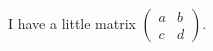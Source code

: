\documentclass{article}
\begin{document}
I have a little matrix $ ( \begin{smallmatrix} a&b\\c&d \end{smallmatrix} ) $.
\end{document}
